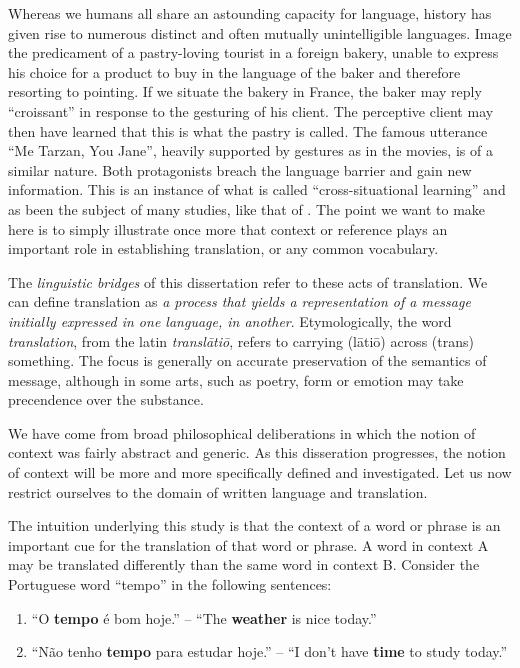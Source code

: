 Whereas we humans all share an astounding capacity for language, history has given rise to numerous distinct and often
mutually unintelligible languages.  Image the predicament of a pastry-loving tourist in a foreign bakery, unable to
express his choice for a product to buy in the language of the baker and therefore resorting to pointing. If we situate
the bakery in France, the baker may reply ``croissant'' in response to the gesturing of his client. The perceptive
client may then have learned that this is what the pastry is called.  The famous utterance ``Me Tarzan, You Jane'',
heavily supported by gestures as in the movies, is of a similar nature. Both protagonists breach the language barrier
and gain new information. This is an instance of what is called ``cross-situational learning'' and as been the subject
of many studies, like that of \cite{PINKER89}. The point we want to make here is to simply illustrate once more that
context or reference plays an important role in establishing translation, or any common vocabulary.


The \emph{linguistic bridges} of this dissertation refer to these acts of
translation. We can define translation as \emph{a process that yields a
representation of a message initially expressed in one language, in another}.
Etymologically, the word \emph{translation}, from the latin \emph{transl\=ati\=o},
refers to carrying (l\=ati\=o) across (trans) something. The focus is generally on
accurate preservation of the semantics of message, although in some arts, such
as poetry, form or emotion may take precendence over the substance.

We have come from broad philosophical deliberations in which the notion of context was fairly abstract and
generic. As this disseration progresses, the notion of context will be more and more specifically defined and investigated.
Let us now restrict ourselves to the domain of written language and translation.

The intuition underlying this study is that the context of a word or phrase is an important cue for the
translation of that word or phrase. A word in context A may be translated differently than the same word in context B.
Consider the Portuguese word ``tempo'' in the following sentences:

\begin{enumerate}
\item ``O \textbf{tempo} é bom hoje.'' -- ``The \textbf{weather} is nice today.''
\item ``Não tenho \textbf{tempo} para estudar hoje.'' -- ``I don't have \textbf{time} to study today.''
\end{enumerate}

